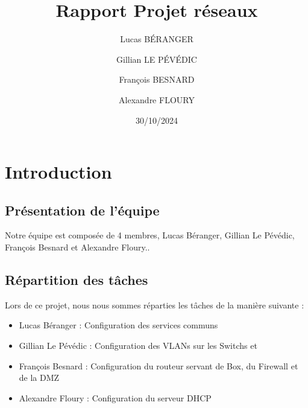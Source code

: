 \documentclass[a4paper,12pt,openany]{report}
\title{Rapport Projet réseaux}
\author{
    Lucas BÉRANGER \and
    Gillian LE PÉVÉDIC \and
    François BESNARD \and
    Alexandre FLOURY \and
}
\date{30/10/2024}
\begin{document}
    \maketitle  
    \newpage

    \tableofcontents
    \newpage
    \listoffigures

    \chapter{Introduction}
        \section{Présentation de l'équipe}  
            Notre équipe est composée de 4 membres, Lucas Béranger, Gillian Le Pévédic, François Besnard et Alexandre Floury..

        \section{Répartition des tâches}
            Lors de ce projet, nous nous sommes réparties les tâches de la manière suivante :
            \begin{itemize}
                \item Lucas Béranger : Configuration des services communs
                \item Gillian Le Pévédic : Configuration des VLANs sur les Switchs et 
                \item François Besnard :  Configuration du routeur servant de Box, du Firewall et de la DMZ
                \item Alexandre Floury : Configuration du serveur DHCP
            \end{itemize}
\end{document}
